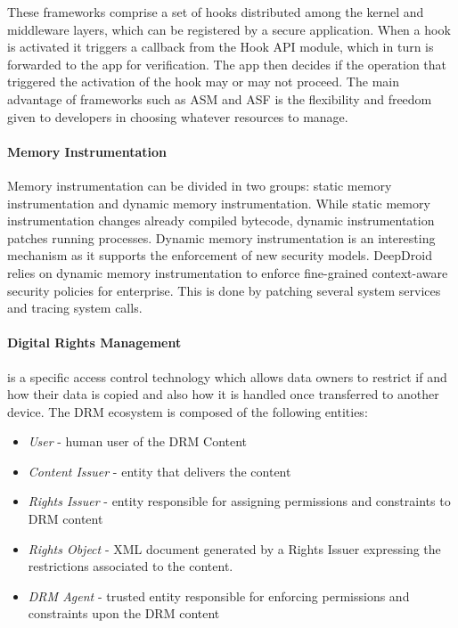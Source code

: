 These frameworks comprise a set of hooks distributed among the kernel and middleware layers, which can be registered by a secure application. When a hook is activated it triggers a callback from the Hook API module, which in turn is forwarded to the app for verification. The app then decides if the operation that triggered the activation of the hook may or may not proceed. The main advantage of frameworks such as \ac{ASM} \cite{heuser2014asm} and \ac{ASF} \cite{backes2014android} is the flexibility and freedom given to developers in choosing whatever resources to manage.

\paragraph{\textbf{Memory Instrumentation}}
Memory instrumentation can be divided in two groups: static memory instrumentation and dynamic memory instrumentation. While static memory instrumentation changes already compiled bytecode, dynamic instrumentation patches running processes. Dynamic memory instrumentation is an interesting mechanism as it supports the enforcement of new security models. DeepDroid \cite{wang2015deepdroid} relies on dynamic memory instrumentation to enforce fine-grained context-aware security policies for enterprise. This is done by patching several system services and tracing system calls.

\paragraph{\textbf{Digital Rights Management}} is a specific access control technology which allows data owners to restrict if and how their data is copied and also how it is handled once transferred to another device. The \ac{DRM} ecosystem is composed of the following entities:

\begin{itemize}
	\item \emph{User} - human user of the DRM Content
	\item \emph{Content Issuer} - entity that delivers the content
	\item \emph{Rights Issuer} - entity responsible for assigning permissions and constraints to \ac{DRM} content
	\item \emph{Rights Object} - XML document generated by a Rights Issuer expressing the restrictions associated to the content.
	\item \emph{\ac{DRM} Agent} - trusted entity responsible for enforcing permissions and constraints upon the \ac{DRM} content
\end{itemize}

